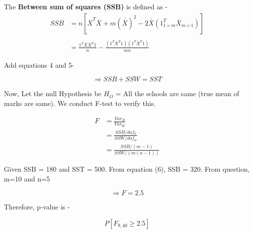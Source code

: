 \documentclass{article}
\begin{document}
The \textbf{Between sum of squares (SSB)} is defined as - 
\begin{equation}
\begin{split}
    SSB &= n[\overline{X}^T \overline{X} + m (\overline{\overline{X}})^2 -2 \overline{\overline{X}} (1^T_{1\times m} \overline{X}_{m\times 1} )] \\
       \\
        &= \frac{1^T X X^T 1}{n} - \frac{(1^T X^T 1)(1^T X^T 1)}{mn}
\end{split}
\end{equation}

\vspace{0.3 cm}

Add equations 4 and 5-

\begin{equation}
    \Rightarrow SSB + SSW = SST
\end{equation}

Now, Let the null Hypothesis be $H_O$ = All the schools are same (true mean of marks are same). We conduct F-test to verify this. 

\begin{equation}
\begin{split}
    F & = \frac{Var_B}{Var_W} \\
      & = \frac{SSB/dof_b}{SSW/dof_w} \\
      & = \frac{SSB/(m-1) }{SSW/(m (n-1))}
\end{split}
\end{equation}

Given SSB = 180 and SST = 500. From equation (6), SSB = 320. From question, m=10 and n=5

\begin{equation}
    \Rightarrow F = 2.5
\end{equation}

Therefore, p-value is - 

\begin{equation}
    P[F_{9,40} \geq 2.5]
\end{equation}
\end{document}
